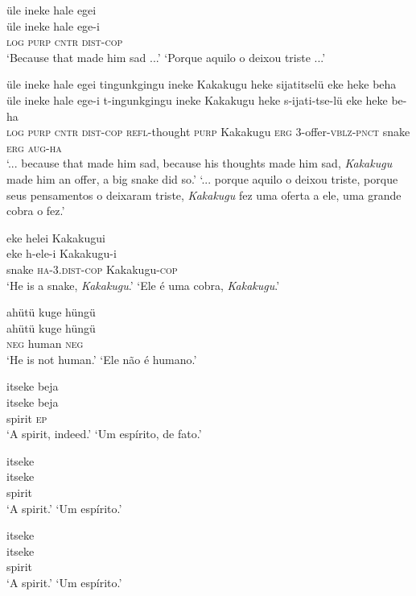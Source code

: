 \documentclass[output=paper,
modfonts,nonflat
]{langsci/langscibook}
\begin{document}
\ea  üle ineke hale egei\\[.3em]
\gll üle ineke hale ege-i\\
     \textsc{log} \textsc{purp} \textsc{cntr} \textsc{dist}-\textsc{cop}\\
\glt ‘Because that made him sad ...’
\glt ‘Porque aquilo o deixou triste ...’
\z

\ea  üle ineke hale egei tingunkgingu ineke Kakakugu heke sijatitselü eke heke beha\\[.3em]
\gll üle ineke hale ege-i t-ingunkgingu ineke Kakakugu heke s-ijati-tse-lü eke heke be-ha\\
     \textsc{log} \textsc{purp} \textsc{cntr} \textsc{dist}-\textsc{cop} \textsc{refl}-thought \textsc{purp} Kakakugu \textsc{erg} 3-offer-\textsc{vblz}-\textsc{pnct} snake \textsc{erg} \textsc{aug}-\textsc{ha}\\
\glt ‘... because that made him sad, because his thoughts made him sad, \textit{Kakakugu} made him an offer, a big snake did so.’
\glt ‘... porque aquilo o deixou triste, porque seus pensamentos o deixaram triste, \textit{Kakakugu} fez uma oferta a ele, uma grande cobra o fez.’
\z

\ea  eke helei Kakakugui\\[.3em]
\gll eke h-ele-i Kakakugu-i\\
     snake \textsc{ha}-3.\textsc{dist}-\textsc{cop} Kakakugu-\textsc{cop}\\
\glt ‘He is a snake, \textit{Kakakugu}.’
\glt ‘Ele é uma cobra, \textit{Kakakugu}.’
\z

\ea  ahütü kuge hüngü\\[.3em]
\gll ahütü kuge hüngü\\
     \textsc{neg} human \textsc{neg}\\
\glt ‘He is not human.’
\glt ‘Ele não é humano.’
\z

\ea  itseke beja\\[.3em]
\gll itseke beja\\
     spirit \textsc{ep}\\
\glt ‘A spirit, indeed.’
\glt ‘Um espírito, de fato.’
\z

\newpage 
\ea  itseke\\[.3em]
\gll itseke\\
     spirit\\
\glt ‘A spirit.’
\glt ‘Um espírito.’
\z

\ea  itseke\\[.3em]
\gll itseke\\
     spirit\\
\glt ‘A spirit.’
\glt ‘Um espírito.’
\z
\end{document}

